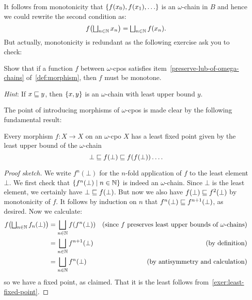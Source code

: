 It follows from monotonicity that \(\set{f(x_0),f(x_1),\dots}\) is an
\(\omega\)-chain in \(B\) and hence we could rewrite the second condition as:
\[
  f\pa*{\textstyle\bigsqcup_{n \in \Nat}x_n} = \textstyle\bigsqcup_{n \in
    \Nat}f(x_n).
\]
%
But actually, monotonicity is redundant as the following exercise ask you to
check:

\begin{exercise}\label{exer:monotonicity-follows}
  Show that if a function \(f\) between \(\omega\)-cpos satisfies
  item~\ref{preserve-lub-of-omega-chains} of~\cref{def:morphism}, then \(f\)
  must be monotone.

  \emph{Hint}: If \(x \sqsubseteq y\), then \(\{x,y\}\) is an \(\omega\)-chain with
  least upper bound \(y\).
\end{exercise}

The point of introducing morphisms of \(\omega\)-cpos is made clear by the
following fundamental result:

\begin{theorem}\label{least-fixed-point}
  Every morphism \(f \colon X \to X\) on an \(\omega\)-cpo \(X\) has a least
  fixed point given by the least upper bound of the \(\omega\)-chain
  \[
    \bot \sqsubseteq f(\bot) \sqsubseteq f(f(\bot)) \dots.
  \]
\end{theorem}
\begin{proof}[Proof sketch]
  We write \(f^n(\bot)\) for the \(n\)-fold application of \(f\) to the least
  element \(\bot\).
  We first check that \(\{f^n(\bot) \mid n \in \mathbb N\}\) is indeed an
  \(\omega\)-chain.
  Since \(\bot\) is the least element, we certainly have
  \(\bot \sqsubseteq f(\bot)\). But now we also have \(f(\bot) \sqsubseteq f^2(\bot)\) by
  monotonicity of \(f\). It follows by induction on \(n\) that
  \(f^n(\bot) \sqsubseteq f^{n+1}(\bot)\), as desired.
  Now we calculate:
  \begin{align*}
    f\pa*{\textstyle\bigsqcup_{n \in \Nat}f_n(\bot)}
    &= \bigsqcup_{n \in \Nat}f\pa*{f^n(\bot)}
    &\text{(since \(f\) preserves least upper bounds of \(\omega\)-chains)} \\
    &= \bigsqcup_{n \in \Nat}f^{n+1}(\bot)
    &\text{(by definition)} \\
    &= \bigsqcup_{n \in \Nat}f^{n}(\bot)
    &\text{(by antisymmetry and calculation)}
  \end{align*}
  so we have a fixed point, as claimed. That it is the least follows
  from~\cref{exer:least-fixed-point}.
\end{proof}

